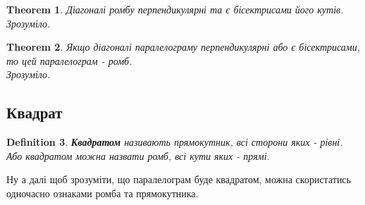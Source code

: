 \documentclass[a4paper, 10pt]{article}
\theoremstyle{theoremdd}
\newtheorem{theorem}{Theorem}[subsection]
\theoremstyle{theoremdd}
\theoremstyle{theoremdd}
\newtheorem{definition}[theorem]{Definition}
\theoremstyle{theoremdd}
\theoremstyle{theoremdd}
\theoremstyle{theoremdd}
\theoremstyle{theoremdd}
\theoremstyle{theoremdd}
\theoremstyle{theoremdd}
\begin{document}
\begin{theorem}
Діагоналі ромбу перпендикулярні та є бісектрисами його кутів.\\
\textit{Зрозуміло.}
\end{theorem}

\begin{theorem}
Якщо діагоналі паралелограму перпендикулярні або є бісектрисами, то цей паралелограм - ромб.\\
\textit{Зрозуміло.}
\end{theorem}

\subsection{Квадрат}
\begin{definition}
\textbf{Квадратом} називають прямокутник, всі сторони яких - рівні.\\
Або квадратом можна назвати ромб, всі кути яких - прямі.
\begin{figure}[H]
\centering
{}
\end{figure}
\end{definition}

Ну а далі щоб зрозуміти, що паралелограм буде квадратом, можна скористатись одночасно ознаками ромба та прямокутника.
\end{document}
